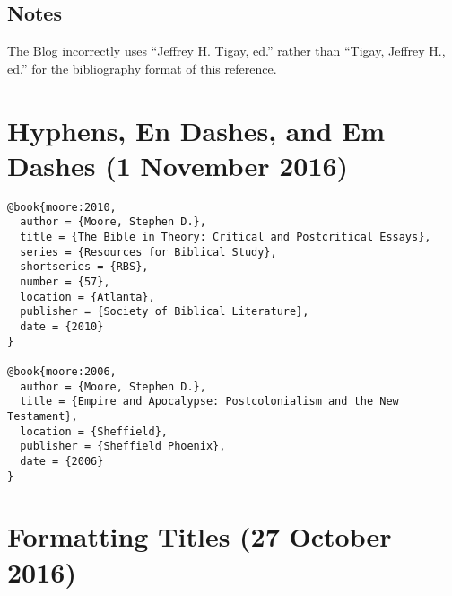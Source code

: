 \documentclass[a4paper]{article}
\begin{document}
\begin{verbcite}
  \nocite{harrison+welborn:forthcoming}
\end{verbcite}
\exampleabbreviations
\examplebibliography

\subsection{Notes}

The Blog incorrectly uses “Jeffrey H. Tigay, ed.” rather than “Tigay, Jeffrey
H., ed.” for the bibliography format of this reference.


\section{Hyphens, En Dashes, and Em Dashes (1 November 2016)}

\begin{verbatim}
@book{moore:2010,
  author = {Moore, Stephen D.},
  title = {The Bible in Theory: Critical and Postcritical Essays},
  series = {Resources for Biblical Study},
  shortseries = {RBS},
  number = {57},
  location = {Atlanta},
  publisher = {Society of Biblical Literature},
  date = {2010}
}

@book{moore:2006,
  author = {Moore, Stephen D.},
  title = {Empire and Apocalypse: Postcolonialism and the New Testament},
  location = {Sheffield},
  publisher = {Sheffield Phoenix},
  date = {2006}
}
\end{verbatim}

\begin{verbcite}
  \nocite{moore:2010, moore:2006}
\end{verbcite}
\exampleabbreviations
\examplebibliography
{}

\section{Formatting Titles (27 October 2016)}
\end{document}
